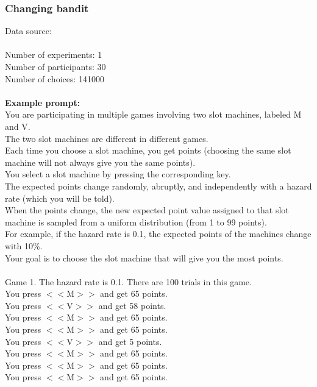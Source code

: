 \documentclass[pdflatex,sn-nature]{sn-jnl}%
\theoremstyle{thmstyleone}%
\theoremstyle{thmstyletwo}%
\theoremstyle{thmstylethree}%
\begin{document}
\subsubsection*{Changing bandit}
Data source: \cite{Xiong2023-ie} \\ $~$ \\ 
Number of experiments: 1 $~$\\ 
Number of participants: 30 $~$\\ 
Number of choices: 141000 $~$\\ 
 $~$\\ 
\textbf{Example prompt:}
 $~$\\ 
You are participating in multiple games involving two slot machines, labeled M and V. $~$\\ 
The two slot machines are different in different games. $~$\\ 
Each time you choose a slot machine, you get points (choosing the same slot machine will not always give you the same points). $~$\\ 
You select a slot machine by pressing the corresponding key. $~$\\ 
The expected points change randomly, abruptly, and independently with a hazard rate (which you will be told). $~$\\ 
When the points change, the new expected point value assigned to that slot machine is sampled from a uniform distribution (from 1 to 99 points). $~$\\ 
For example, if the hazard rate is 0.1, the expected points of the machines change with 10\%. $~$\\ 
Your goal is to choose the slot machine that will give you the most points. $~$\\ 
 $~$\\ 
Game 1. The hazard rate is 0.1. There are 100 trials in this game. $~$\\ 
You press $<<$M$>>$ and get 65 points. $~$\\ 
You press $<<$V$>>$ and get 58 points. $~$\\ 
You press $<<$M$>>$ and get 65 points. $~$\\ 
You press $<<$M$>>$ and get 65 points. $~$\\ 
You press $<<$V$>>$ and get 5 points. $~$\\ 
You press $<<$M$>>$ and get 65 points. $~$\\ 
You press $<<$M$>>$ and get 65 points. $~$\\ 
You press $<<$M$>>$ and get 65 points. $~$\\ 
\end{document}
